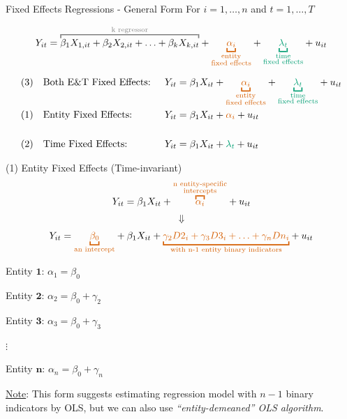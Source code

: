 \documentclass[
  10pt,
  ignorenonframetext,
]{beamer}
\begin{document}
\begin{frame}{Fixed Effects Regressions - General Form}
\protect\hypertarget{fixed-effects-regressions---general-form}{}
For \(i = 1,\ldots,n\) and \(t = 1,\ldots,T\)

\[
Y_{it} = {\color{gray}{\overbracket{\color{black}{\beta_1 X_{1,it} + \beta_2 X_{2,it} + \ldots + \beta_k X_{k,it}}}^{\text{k regressor}}}} + {\color{red}{\underbracket{\alpha_i}_{\substack{\text{entity}\\ \text{fixed effects}}}}} + {\color{green}{\underbracket{\lambda_t}_{\substack{\text{time}\\ \text{fixed effects}}}}} + u_{it}
\]

\[
\begin{aligned}
&(3) \quad \text{Both E}\&\text{T Fixed Effects: } &Y_{it} &= \beta_1 X_{it} + {\color{red}{\underbracket{\alpha_i}_{\substack{\text{entity}\\ \text{fixed effects}}}}} + {\color{green}{\underbracket{\lambda_t}_{\substack{\text{time}\\ \text{fixed effects}}}}} + u_{it}\\
&(1) \quad \text{Entity Fixed Effects: }
&Y_{it} &= \beta_1 X_{it} + {\color{red}{\alpha_i}} + u_{it}\\
\\
&(2) \quad \text{Time Fixed Effects: }
&Y_{it} &= \beta_1 X_{it} + {\color{green}{\lambda_t}} + u_{it}
\end{aligned}
\]
\end{frame}

\begin{frame}{(1) Entity Fixed Effects (Time-invariant)}
\protect\hypertarget{EntityFEs}{}
\[
Y_{it} =  \beta_1 X_{it} + {\color{red}{\overbracket{\alpha_i}^{\substack{\text{n entity-specific}\\ \text{intercepts}}}}} + u_{it}
\] \[\Downarrow\] \[
Y_{it} = {\color{red}{\underbracket{\beta_0}_{\text{an intercept}}}} + \beta_1 X_{it} + {\color{red}{\underbracket{\gamma_2 D2_i + \gamma_3 D3_i + \ldots + \gamma_n Dn_i}_{\text{with n-1 entity binary indicators}}}} +  u_{it}
\]

Entity \(\mathbf{1}\): \(\alpha_1 = \beta_0\)

Entity \(\mathbf{2}\): \(\alpha_2 = \beta_0 + \gamma_2\)

Entity \(\mathbf{3}\): \(\alpha_3 = \beta_0 + \gamma_3\)

\(\vdots\)

Entity \(\mathbf{n}\): \(\alpha_n = \beta_0 + \gamma_n\)

\footnotesize \underline{Note}: This form suggests estimating regression
model with \(n-1\) binary indicators by OLS, but we can also use
\emph{``entity-demeaned'' OLS algorithm}.
\end{frame}
\end{document}
